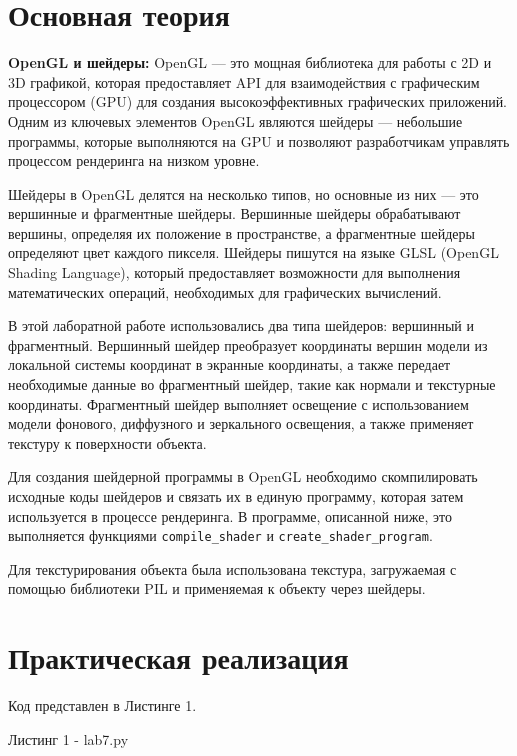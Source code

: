 \documentclass[a4paper, 14pt]{extarticle}
\begin{document}
\section{Основная теория}
\par
\textbf{OpenGL и шейдеры:} OpenGL — это мощная библиотека для работы с 2D и 3D графикой, которая предоставляет API для взаимодействия с графическим процессором (GPU) для создания высокоэффективных графических приложений. Одним из ключевых элементов OpenGL являются шейдеры — небольшие программы, которые выполняются на GPU и позволяют разработчикам управлять процессом рендеринга на низком уровне.
\par
Шейдеры в OpenGL делятся на несколько типов, но основные из них — это вершинные и фрагментные шейдеры. Вершинные шейдеры обрабатывают вершины, определяя их положение в пространстве, а фрагментные шейдеры определяют цвет каждого пикселя. Шейдеры пишутся на языке GLSL (OpenGL Shading Language), который предоставляет возможности для выполнения математических операций, необходимых для графических вычислений.
\par
В этой лаборатной работе использовались два типа шейдеров: вершинный и фрагментный. Вершинный шейдер преобразует координаты вершин модели из локальной системы координат в экранные координаты, а также передает необходимые данные во фрагментный шейдер, такие как нормали и текстурные координаты. Фрагментный шейдер выполняет освещение с использованием модели фонового, диффузного и зеркального освещения, а также применяет текстуру к поверхности объекта.
\par
Для создания шейдерной программы в OpenGL необходимо скомпилировать исходные коды шейдеров и связать их в единую программу, которая затем используется в процессе рендеринга. В программе, описанной ниже, это выполняется функциями \texttt{compile\_shader} и \texttt{create\_shader\_program}.
\par
Для текстурирования объекта была использована текстура, загружаемая с помощью библиотеки PIL и применяемая к объекту через шейдеры.

\pagebreak
\section{Практическая реализация}
Код представлен в Листинге 1.
\par
\begin{center}
    Листинг 1 - lab7.py
\end{center}
\end{document}
